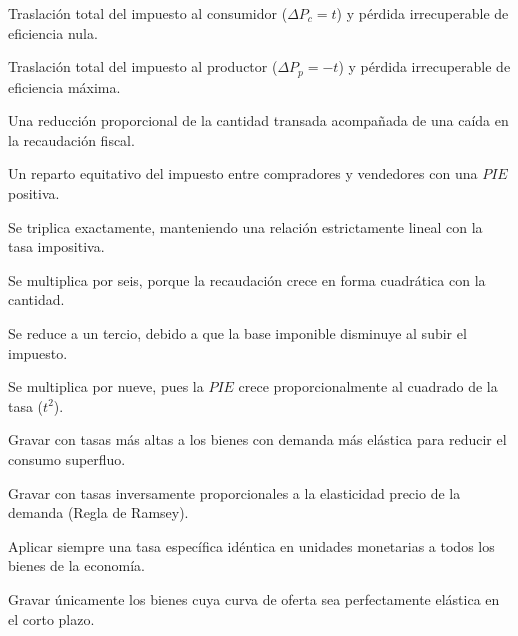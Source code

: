 \begin{opts}
    \item Traslación total del impuesto al consumidor ($\Delta P_c = t$) y pérdida irrecuperable de eficiencia nula.
    \item Traslación total del impuesto al productor ($\Delta P_p = -t$) y pérdida irrecuperable de eficiencia máxima.
    \item Una reducción proporcional de la cantidad transada acompañada de una caída en la recaudación fiscal.
    \item Un reparto equitativo del impuesto entre compradores y vendedores con una $PIE$ positiva.
\end{opts}

\begin{opts}
    \item Se triplica exactamente, manteniendo una relación estrictamente lineal con la tasa impositiva.
    \item Se multiplica por seis, porque la recaudación crece en forma cuadrática con la cantidad.
    \item Se reduce a un tercio, debido a que la base imponible disminuye al subir el impuesto.
    \item Se multiplica por nueve, pues la $PIE$ crece proporcionalmente al cuadrado de la tasa ($t^2$).
\end{opts}

\begin{opts}
    \item Gravar con tasas más altas a los bienes con demanda más elástica para reducir el consumo superfluo.
    \item Gravar con tasas inversamente proporcionales a la elasticidad precio de la demanda (Regla de Ramsey).
    \item Aplicar siempre una tasa específica idéntica en unidades monetarias a todos los bienes de la economía.
    \item Gravar únicamente los bienes cuya curva de oferta sea perfectamente elástica en el corto plazo.
\end{opts}

